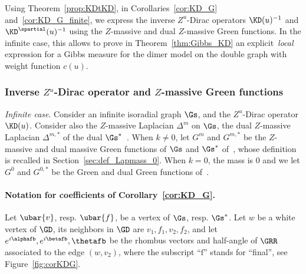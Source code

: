 \documentclass[a4paper,twoside,11pt]{article}
\begin{document}
Using Theorem~\ref{prop:KDtKD}, in Corollaries~\ref{cor:KD_G} and~\ref{cor:KD_G_finite}, we express the inverse $Z^u$-Dirac operators
$\KD(u)^{-1}$ and $\KD^\spartial(u)^{-1}$ using the $Z$-massive and dual $Z$-massive Green functions.
In the infinite case, this allows to prove in 
Theorem~\ref{thm:Gibbs_KD} an explicit~\emph{local} expression for a Gibbs measure for the dimer model on the double graph with weight 
function $c(u)$.

\subsubsection{Inverse $Z^u$-Dirac operator and $Z$-massive Green functions}

\emph{Infinite case}.
Consider an infinite isoradial graph $\Gs$, and the $Z^u$-Dirac operator $\KD(u)$. Consider also the $Z$-massive Laplacian $\Delta^m$ on $\Gs$,
the dual $Z$-massive Laplacian $\Delta^{m,*}$ of the dual $\Gs^*$~\cite{BdTR1}. When 
$k\neq 0$, let $G^m$ and $G^{m,*}$ be the $Z$-massive and dual massive Green functions of $\Gs$ and $\Gs^*$ of~\cite{BdTR1}, 
whose definition is recalled in
Section~\ref{sec:def_Lapmass_0}. When $k=0$, the mass is 0 and we let $G^0$ and $G^{0,*}$ be the Green and dual Green functions of~\cite{Kenyon3}.

\paragraph{Notation for coefficients of Corollary~\ref{cor:KD_G}.}
 Let $\ubar{v}$, resp. $\ubar{f}$, be a vertex of $\Gs$, resp. $\Gs^*$. 
 Let $w$ be a white vertex of $\GD$, its neighbors in $\GD$ are $v_1,f_1,v_2,f_2$, and let 
 $e^{i\alphafb},e^{i\betafb},\thetafb$ be the rhombus vectors and half-angle of $\GRR$ associated to the edge $(w,v_2)$,
 where the subscript ``$\mathrm{f}$'' stands for ``final'', see Figure~\ref{fig:corKDG}.
\end{document}
